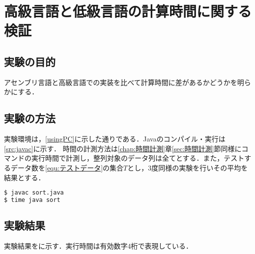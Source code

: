 \chapter{高級言語と低級言語の計算時間に関する検証}
\section{実験の目的}
アセンブリ言語と高級言語での実装を比べて計算時間に差があるかどうかを明らかにする．
\section{実験の方法}
実験環境は，\ref{usingPC}に示した通りである．{\ttfamily Java}のコンパイル・実行は\ref{src:javac}に示す．
時間の計測方法は\ref{chap:時間計測}章\ref{sec:時間計測}節同様にコマンドの実行時間で計測し，整列対象のデータ列は全て{}とする．また，テストするデータ数を\eqref{equ:テストデータ}の集合\(T\)とし，3度同様の実験を行いその平均を結果とする．
\begin{lstlisting}[caption={{\ttfamily Java}コンパイル・実行時間の計測}, label={src:javac}, language={Bash},frame={single},numbers={none}]
$ javac sort.java
$ time java sort
\end{lstlisting}
\section{実験結果}
実験結果をに示す．実行時間は有効数字4桁で表現している．\\
\begin{minipage}[t]{0.35\textwidth}
    \centering
    \label{tbl:データの個数と}
\end{minipage}
\begin{minipage}[t]{0.6\textwidth}
    \centering
    \label{fig:比較}
\end{minipage}